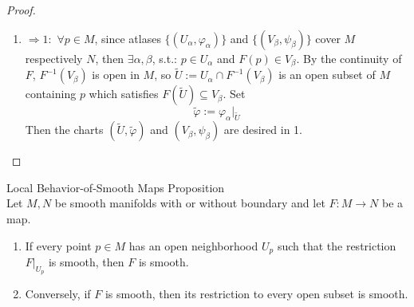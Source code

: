 \begin{proof}
\begin{enumerate}
        \item $\Rightarrow 1:$ $\forall p\in M$, since atlases $\{(U_\alpha, \varphi_\alpha)\}$ and $\{(V_\beta,\psi_\beta)\}$ cover $M$ respectively $N$, then $\exists \alpha, \beta$, s.t.: $p\in U_\alpha$ and $F(p) \in V_\beta$. By the continuity of $F$, $F^{-1}(V_\beta)$ is open in $M$, so $\widetilde{U}:= U_\alpha \cap F^{-1} (V_\beta)$ is an open subset of $M$ containing $p$ which satisfies $F(\widetilde{U}) \subseteq V_\beta$. Set
        \[
        \widetilde{\varphi}:= \varphi_\alpha|_{\widetilde{U}}
        \]
        Then the charts $(\widetilde{U}, \widetilde{\varphi})$ and $(V_\beta, \psi_\beta)$ are desired in 1.
    \end{enumerate}
\end{proof}

\begin{proposition}{Local Behavior-of-Smooth Maps Proposition}\\
Let $M,N$ be smooth manifolds with or without boundary and let $F: M\to N$ be a map.
\begin{enumerate}
    \item If every point $p\in M$ has an open neighborhood $U_p$ such that the restriction $F|_{U_p}$ is smooth, then $F$ is smooth.
    \item Conversely, if $F$ is smooth, then its restriction to every open subset is smooth.
\end{enumerate}
\end{proposition}

